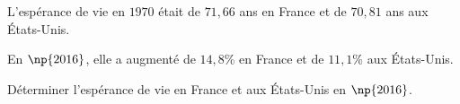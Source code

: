 \begin{exo}{}
	L'espérance de vie en $1970$ était de $71,66$ ans en France et de $70,81$ ans aux États-Unis.

	En $\np{2016}$, elle a augmenté de $14,8$\% en France et de $11,1$\% aux États-Unis.


	Déterminer l'espérance de vie en France et aux États-Unis en $\np{2016}$.
\end{exo}
